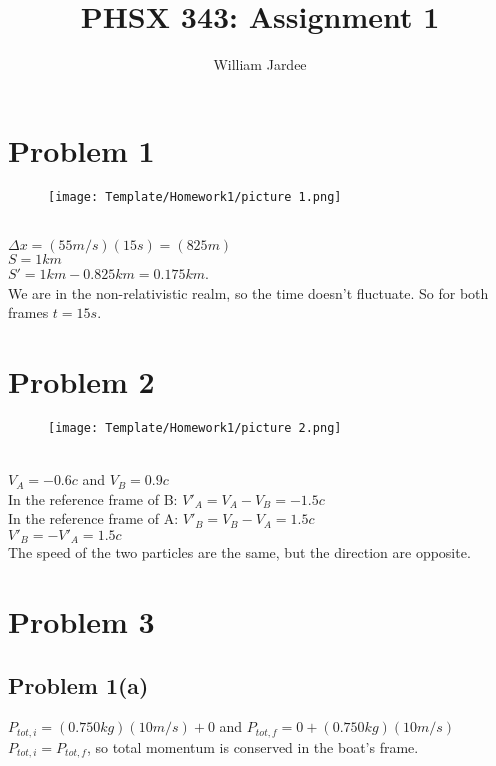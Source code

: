 \documentclass[11pt]{article}
\begin{document}
\date{}

\title{PHSX 343: Assignment 1}

\author{William Jardee}

\maketitle


\section*{Problem 1}

\begin{figure}[h]
    \texttt{[image: Template/Homework1/picture 1.png]}
    \label{fig:my_label}
\end{figure}\\
\noindent 
$\Delta x = (55m/s)(15s) = (825 m)$\\
$S = 1km$\\
$S' = 1km - 0.825km = 0.175km$. \\
We are in the non-relativistic realm, so the time doesn't fluctuate. So for both frames $t = 15s$.

\section*{Problem 2}

\begin{figure}[h]
    \texttt{[image: Template/Homework1/picture 2.png]}
    \label{fig:my_label}
\end{figure}\\
\noindent
$V_A = -0.6c$ and $V_B = 0.9c$\\
In the reference frame of B: $V'_A = V_A - V_B = -1.5c$\\
In the reference frame of A: $V'_B = V_B - V_A = 1.5c$\\
${V'_B} = -{V'_A} = 1.5c$\\
The speed of the two particles are the same, but the direction are opposite.

\section*{Problem 3}

\subsection*{Problem 1(a)}
$P_{tot,i} = (0.750kg)(10m/s) + 0$ and $P_{tot,f} = 0 + (0.750kg)(10m/s)$\\
$P_{tot,i} = P_{tot,f}$, so total momentum is conserved in the boat's frame.
\end{document}
